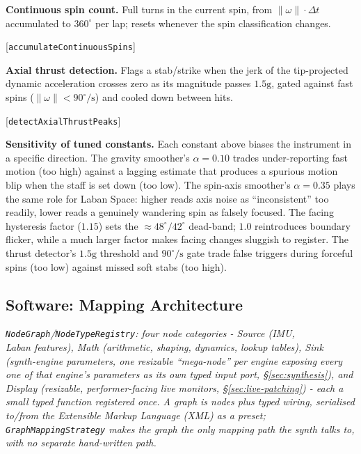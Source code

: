 \documentclass[sigconf,nonacm]{acmart}
\newcommand{\coderef}[1]{{\small [#1]}}
\begin{document}
\textbf{Continuous spin count.} Full turns in the current spin, from $\lVert\omega\rVert\cdot\Delta t$
accumulated to $360^\circ$ per lap; resets whenever the spin classification changes.
\begin{flushright}
\coderef{\texttt{accumulateContinuousSpins}}
\end{flushright}

\textbf{Axial thrust detection.} Flags a stab/strike when the jerk of the tip-projected dynamic
acceleration crosses zero as its magnitude passes $1.5\text{g}$, gated against fast spins
($\lVert\omega\rVert < 90^\circ/\text{s}$) and cooled down between hits.
\begin{flushright}
\coderef{\texttt{detectAxialThrustPeaks}}
\end{flushright}

\textbf{Sensitivity of tuned constants.} Each constant above biases the instrument in a specific
direction. The gravity smoother's $\alpha{=}0.10$ trades under-reporting fast
motion (too high) against a lagging estimate that produces a spurious motion blip when the staff is
set down (too low). The spin-axis smoother's $\alpha{=}0.35$ plays the same role for Laban Space:
higher reads axis noise as ``inconsistent'' too readily, lower reads a genuinely wandering spin as
falsely focused. The facing hysteresis factor ($1.15$) sets the $\approx\!48^\circ/42^\circ$
dead-band; $1.0$ reintroduces boundary flicker, while a much larger factor makes facing changes
sluggish to register. The thrust detector's $1.5\text{g}$ threshold and $90^\circ/\text{s}$ gate trade
false triggers during forceful spins (too low) against missed soft stabs (too high).

\subsection{Software: Mapping Architecture}
\textit{\texttt{NodeGraph}/\texttt{NodeTypeRegistry}: four node categories - Source (IMU,\\
Laban features), Math (arithmetic, shaping, dynamics, lookup tables), Sink (synth-engine
parameters, one resizable ``mega-node'' per engine exposing every one of that engine's parameters
as its own typed input port, \S\ref{sec:synthesis}),
and Display (resizable, performer-facing live monitors, \S\ref{sec:live-patching}) - each a
small typed function registered once. A graph is nodes plus typed wiring, serialised to/from the
Extensible Markup Language (XML) as
a preset; \texttt{GraphMappingStrategy} makes the graph the only mapping path the synth talks to,
with no separate hand-written path.}
\end{document}
